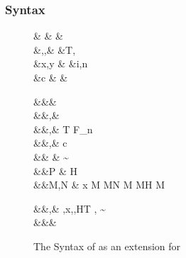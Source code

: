 \documentclass[manuscript,screen,nonacm]{acmart}
\begin{document}
\subsubsection{Syntax}

\begin{figure}[h]
 \centering
 \begin{syntax}
  &\shl{\chi} &  & \\
  &\TyVar,\beta,\Co &\qquad{} &T, \\
  &x,y &\qquad{} &i,n \in {} \\
  &c & &
 \end{syntax}
 \begin{syntax}
  &&\square & \\
  &&\kappa,\eta \bnfeq& \shl{\chi} \bnfor \STAR \bnfor {} \bnfor \kappa \to \kappa \bnfor {}\\
  &&\tau,\sigma \bnfeq& \TyVar \bnfor T \bnfor \tau \to \tau \bnfor \tau\App\tau \bnfor \Forall {\TyVar\co\kappa} \tau \bnfor F_n \bnfor \shl{\Forall \chi \tau} \bnfor \shl{\tau\App\kappa} \bnfor {}\\
  &&\nu,\Co \bnfeq& c \bnfor {}\tau \bnfor \Sym\Co \bnfor \trans\nu\Co %
 \bnfor \Forall {\TyVar\co\kappa} \Co \bnfor \Co\At\tau %
 \bnfor \nu\App\Co \bnfor \Left \Co \bnfor \Right \Co  %
 \bnfor \shl{\Forall \chi \Co} \bnfor \shl{\Co\App\chi} %
 \bnfor \shl{\Co\At\chi}\\
  && \phi \bnfeq& \sigma \sim \tau\\
  &&P \bnfeq& H\App\shl{\many\chi}\App\many{\TyVar\co\kappa} \\
  &&M,N \bnfeq& x \bnfor {} M \bnfor M\App N \bnfor \TLam{\tau\co\kappa} M \bnfor M\App \tau \bnfor H \bnfor \Case M  \bnfor \Cast \Tm \Co %
 \bnfor \shl{\TLam \chi \Tm} \bnfor \shl{\Tm\App\kappa} \\

 \end{syntax}
 \begin{syntax}
  &&\TEnv,\Delta \bnfeq& \empt \bnfor \TEnv,x\co\tau \bnfor \TEnv,\TyVar\co\kappa \bnfor \TEnv,H\co T \bnfor \TEnv, \Co \co \tau\sim\sigma\\
  &&\Subst \bnfeq& \empt \bnfor \Set{\many{\TyVar \mapsto \tau}}
 \end{syntax}
 \caption{The Syntax of \SFP as an extension for \SFR}
 \label{fig:sfp-syntax}
\end{figure}
\end{document}
